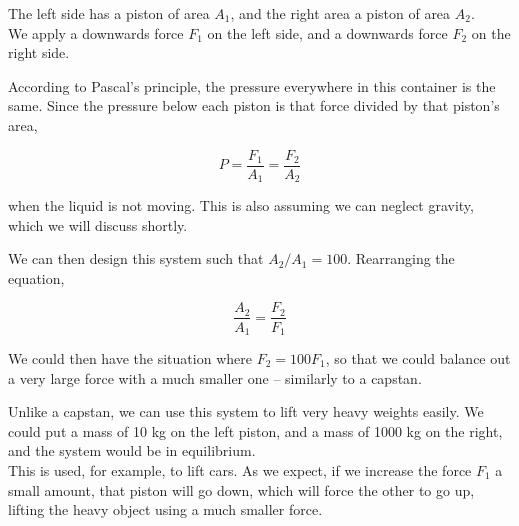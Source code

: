 \begin{figure}[H]
\end{figure}


The left side has a piston of area $A_1$, and the right area a piston of area $A_2$.\\
We apply a downwards force $F_1$ on the left side, and a downwards force $F_2$ on the right side.

According to Pascal's principle, the pressure everywhere in this container is the same. Since the pressure below each piston is that force divided by that piston's area,

\begin{equation}
P = \frac{F_1}{A_1} = \frac{F_2}{A_2}
\end{equation}

when the liquid is not moving. This is also assuming we can neglect gravity, which we will discuss shortly.

We can then design this system such that $A_2/A_1 = 100$. Rearranging the equation,

\begin{equation}
\frac{A_2}{A_1} = \frac{F_2}{F_1}
\end{equation}

We could then have the situation where $F_2 = 100 F_1$, so that we could balance out a very large force with a much smaller one -- similarly to a capstan.

Unlike a capstan, we can use this system to lift very heavy weights easily. We could put a mass of 10 kg on the left piston, and a mass of 1000 kg on the right, and the system would be in equilibrium.\\
This is used, for example, to lift cars. As we expect, if we increase the force $F_1$ a small amount, that piston will go down, which will force the other to go up, lifting the heavy object using a much smaller force.

